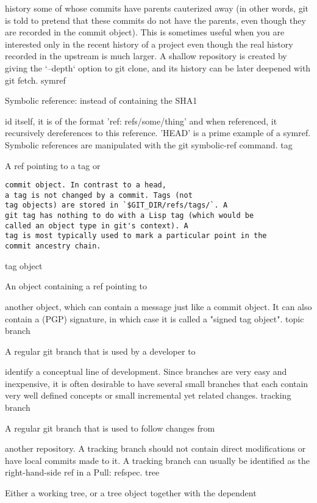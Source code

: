 history some of whose commits have parents cauterized away (in other
words, git is told to pretend that these commits do not have the
parents, even though they are recorded in the commit
object). This is sometimes useful when you are interested only in the
recent history of a project even though the real history recorded in the
upstream is much larger. A shallow repository
is created by giving the `--depth` option to git clone, and
its history can be later deepened with git fetch.
symref

Symbolic reference: instead of containing the SHA1

id itself, it is of the format 'ref: refs/some/thing' and when
referenced, it recursively dereferences to this reference.
'HEAD' is a prime example of a symref. Symbolic
references are manipulated with the git symbolic-ref
command.
tag

A ref pointing to a tag or

\scriptsize
\begin{verbatim}commit object. In contrast to a head,
a tag is not changed by a commit. Tags (not
tag objects) are stored in `$GIT_DIR/refs/tags/`. A
git tag has nothing to do with a Lisp tag (which would be
called an object type in git's context). A
tag is most typically used to mark a particular point in the
commit ancestry chain.
\end{verbatim}
\normalsize

tag object

An object containing a ref pointing to

another object, which can contain a message just like a
commit object. It can also contain a (PGP)
signature, in which case it is called a "signed tag object".
topic branch

A regular git branch that is used by a developer to

identify a conceptual line of development. Since branches are very easy
and inexpensive, it is often desirable to have several small branches
that each contain very well defined concepts or small incremental yet
related changes.
tracking branch

A regular git branch that is used to follow changes from

another repository. A tracking
branch should not contain direct modifications or have local commits
made to it. A tracking branch can usually be
identified as the right-hand-side ref in a Pull:
refspec.
tree

Either a working tree, or a tree object together with the dependent

